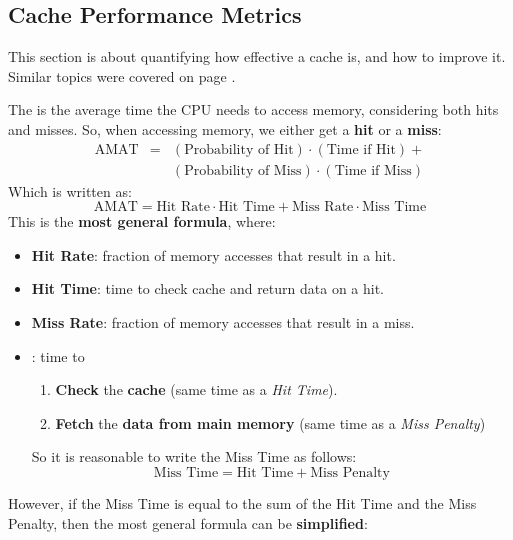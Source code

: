 \subsection{Cache Performance Metrics}

This section is about quantifying how effective a cache is, and how to improve it. Similar topics were covered on page \pageref{subsection: Memory Hierarchy}.

\highspace
The  is the average time the CPU needs to access memory, considering both hits and misses. So, when accessing memory, we either get a \textbf{hit} or a \textbf{miss}:
\begin{equation*}
    \begin{array}{rcl}
        \text{AMAT} &=& (\text{Probability of Hit}) \cdot (\text{Time if Hit}) + \\ [.3em]
        && (\text{Probability of Miss}) \cdot (\text{Time if Miss})
    \end{array}
\end{equation*}
Which is written as:
\begin{equation}
    \text{AMAT} = \text{Hit Rate} \cdot \text{Hit Time} + \text{Miss Rate} \cdot \text{Miss Time}
\end{equation}
This is the \textbf{most general formula}, where:
\begin{itemize}
    \item \textbf{Hit Rate}: fraction of memory accesses that result in a hit.
    \item \textbf{Hit Time}: time to check cache and return data on a hit.
    \item \textbf{Miss Rate}: fraction of memory accesses that result in a miss.
    \item {}: time to
    \begin{enumerate}
        \item \textbf{Check} the \textbf{cache} (same time as a \emph{Hit Time}).
        \item \textbf{Fetch} the \textbf{data from main memory} (same time as a \emph{Miss Penalty})
    \end{enumerate}
    So it is reasonable to write the Miss Time as follows:
    \begin{equation}
        \text{Miss Time} = \text{Hit Time} + \text{Miss Penalty}
    \end{equation}
\end{itemize}
However, if the Miss Time is equal to the sum of the Hit Time and the Miss Penalty, then the most general formula can be \textbf{simplified}:
